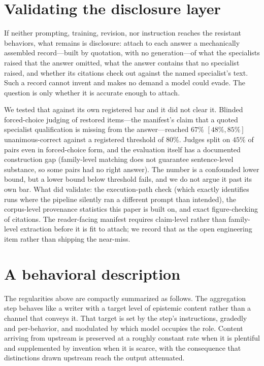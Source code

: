 \documentclass[11pt]{article}
\begin{document}
\section{Validating the disclosure layer}
\label{sec:manifest}
If neither prompting, training, revision, nor instruction reaches the
resistant behaviors, what remains is disclosure: attach to each answer a
mechanically assembled record---built by quotation, with no generation---of
what the specialists raised that the answer omitted, what the answer
contains that no specialist raised, and whether its citations check out
against the named specialist's text. Such a record cannot invent and makes
no demand a model could evade. The question is only whether it is accurate
enough to attach.

We tested that against its own registered bar and it did not clear it.
Blinded forced-choice judging of restored items---the manifest's claim that
a quoted specialist qualification is missing from the answer---reached
$67\%$ $[48\%,85\%]$ unanimous-correct against a registered threshold of
$80\%$. Judges split on $45\%$ of pairs even in forced-choice form, and the
evaluation itself has a documented construction gap (family-level matching
does not guarantee sentence-level substance, so some pairs had no right
answer). The number is a confounded lower bound, but a lower bound below
threshold fails, and we do not argue it past its own bar. What did
validate: the execution-path check (which exactly identifies runs where the
pipeline silently ran a different prompt than intended), the corpus-level
provenance statistics this paper is built on, and exact figure-checking of
citations. The reader-facing manifest requires claim-level rather than
family-level extraction before it is fit to attach; we record that as the
open engineering item rather than shipping the near-miss.

\section{A behavioral description}
\label{sec:model}
The regularities above are compactly summarized as follows. The aggregation
step behaves like a writer with a target level of epistemic content rather
than a channel that conveys it. That target is set by the step's instructions,
gradedly and per-behavior, and modulated by which model occupies the role.
Content arriving from upstream is preserved at a roughly constant rate when it
is plentiful and supplemented by invention when it is scarce, with the
consequence that distinctions drawn upstream reach the output attenuated.
\end{document}
